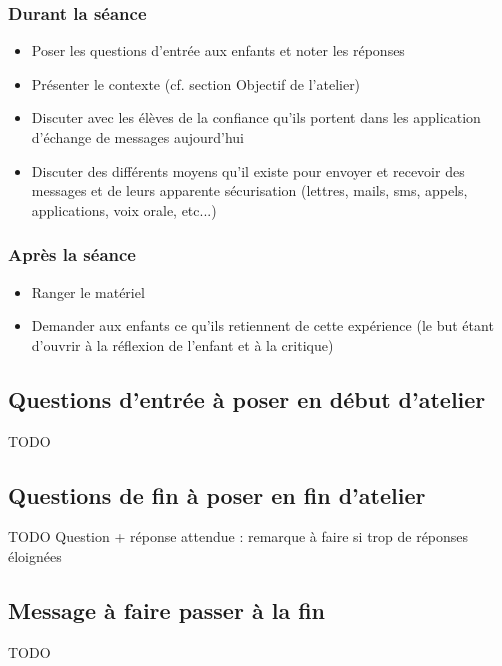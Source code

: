 \documentclass[a4paper]{article}
\begin{document}
\subsubsection{Durant la séance}
\begin{itemize}
  \setlength\itemsep{0em}
  \item Poser les questions d'entrée aux enfants et noter les réponses
  \item Présenter le contexte (cf. section Objectif de l'atelier)
  \item Discuter avec les élèves de la confiance qu'ils portent dans les application d'échange de messages aujourd'hui
  \item Discuter des différents moyens qu'il existe pour envoyer et recevoir des messages et de leurs apparente sécurisation (lettres, mails, sms, appels, applications, voix orale, etc...)
\end{itemize}

\subsubsection{Après la séance}
\begin{itemize}
  \setlength\itemsep{0em}
  \item Ranger le matériel
  \item Demander aux enfants ce qu'ils retiennent de cette expérience (le but étant d'ouvrir à la réflexion de l'enfant et à la critique)
\end{itemize}

\subsection{Questions d'entrée à poser en début d'atelier}
TODO
\subsection{Questions de fin à poser en fin d'atelier}
TODO
Question + réponse attendue : remarque à faire si trop de réponses éloignées

\subsection{Message à faire passer à la fin}
TODO
\end{document}
